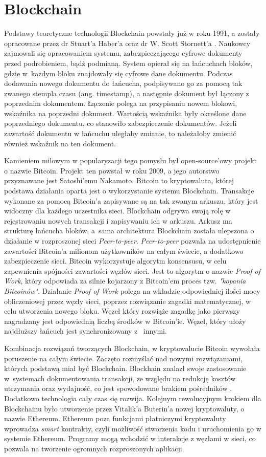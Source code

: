 \documentclass[a4paper,12pt]{book}
\begin{document}
\chapter{Blockchain}
Podstawy teoretyczne technologii Blockchain powstały już w roku 1991, a zostały opracowane przez dr Stuart'a Haber'a oraz dr W. Scott Stornett'a \cite{bchistory}. Naukowcy zajmowali się opracowaniem systemu, zabezpieczającego cyfrowe dokumenty przed podrobieniem, bądź podmianą. System opierał się na łańcuchach bloków, gdzie w~każdym bloku znajdowały się cyfrowe dane dokumentu. Podczas dodawania nowego dokumentu do łańcucha, podpisywano go za pomocą tak zwanego stempla czasu (ang. timestamp), a następnie dokument był łączony z poprzednim dokumentem. Łączenie polega na przypisaniu nowem blokowi, wskaźnika na poprzedni dokument. Wartością wskaźnika były określone dane poprzedniego dokumentu, co stanowiło zabezpieczenie dokumentów. Jeżeli zawartość dokumentu w łańcuchu uległaby zmianie, to należałoby zmienić również wskaźnik na ten dokument\cite{pa}.

Kamieniem milowym w popularyzacji tego pomysłu był open-source'owy projekt o nazwie Bitcoin. Projekt ten powstał w roku 2009, a jego autorstwo przyznawane jest Satoshi'emu Nakamoto. Bitcoin to kryptowaluta, której podstawa działania oparta jest o wykorzystanie systemu Blockchain. Transakcje wykonane za pomocą Bitcoin'a zapisywane są na tak zwanym arkuszu, który jest widoczny dla każdego uczestnika sieci. Blockchain odgrywa swoją rolę w rejestrowaniu nowych transakcji i zapisywaniu ich w arkuszu. Arkusz ma strukturę łańcucha bloków, a~sama architektura Blockchain została ulepszona o działanie w rozproszonej sieci \textit{Peer-to-peer}. \textit{Peer-to-peer} pozwala na udostępnienie zawartości Bitcoin'a milionom użytkowników na całym świecie, a dodatkowo zabezpieczenie sieci. Bitcoin wykorzystuje algorytm konsensusu, w celu zapewnienia spójności zawartości węzłów sieci. Jest to algorytm o nazwie \textit{Proof of Work}, który odpowiada za silnie kojarzony z Bitcoin'em proces tzw. \textit{"kopania Bitcoinów"}.
Działanie \textit{Proof of Work} polega na wkładzie odpowiedniej ilości mocy obliczeniowej przez węzły sieci, poprzez rozwiązanie zagadki matematycznej, w celu utworzenia nowego bloku. Węzeł który rozwiąże zagadkę jako pierwszy nagradzany jest odpowiednią liczbą środków w Bitcoin'ie. Węzeł, który ułoży najdłuższy łańcuch jest synchronizowany z~ innymi\cite{bitcoin}.

Kombinacja rozwiązań tworzących Blockchain, w kryptowalucie Bitcoin wywołała poruszenie na całym świecie. Zaczęto rozmyślać nad nowymi rozwiązaniami, których podstawą miał być Blockchain. Blockhain znalazł swoje zastosowanie w~systemach dokumentowania transakcji, ze względu na redukcję kosztów utrzymania oraz wydajność, co jest spowodowane brakiem pośredników \cite{business}. Dodatkowo technologia cały czas się rozwija. Kolejnym rewolucyjnym krokiem dla Blockchainu było utworzenie przez Vitalik'a Buterin'a nowej kryptowaluty, o nazwie Ethereum. Ethereum poza funkcjami płatniczymi kryptowaluty wprowadza \textit{smart} kontrakty, czyli możliwość stworzenia kodu i uruchomienia go w systemie Ethereum. Programy mogą wchodzić w interakcje z węzłami w sieci, co pozwala na tworzenie ogromnych rozproszonych aplikacji.
\end{document}
